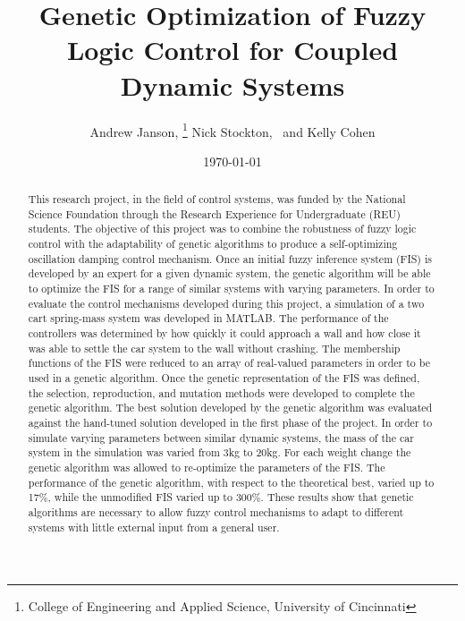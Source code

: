 \documentclass[submit]{aiaa-tc}
\title{Genetic Optimization of Fuzzy Logic Control for Coupled Dynamic Systems}
\author{ %
	Andrew Janson,%
		\thanks{College of Engineering and Applied Science, University of Cincinnati} \space
	 Nick Stockton,%
		\thanksibid{1}
	\ and 
	Kelly Cohen%
		\thanksibid{1}
		}
\date{\today}
\begin{document}
\maketitle
\begin{abstract}
This research project, in the field of control systems, was funded by the National Science Foundation through the Research Experience for Undergraduate (REU) students. The objective of this project was to combine the robustness of fuzzy logic control with the adaptability of genetic algorithms to produce a self-optimizing oscillation damping control mechanism. Once an initial fuzzy inference system (FIS) is developed by an expert for a given dynamic system, the genetic algorithm will be able to optimize the FIS for a range of similar systems with varying parameters. In order to evaluate the control mechanisms developed during this project, a simulation of a two cart spring-mass system was developed in MATLAB. The performance of the controllers was determined by how quickly it could approach a wall and how close it was able to settle the car system to the wall without crashing. The membership functions of the FIS were reduced to an array of real-valued parameters in order to be used in a genetic algorithm. Once the genetic representation of the FIS was defined, the selection, reproduction, and mutation methods were developed to complete the genetic algorithm. The best solution developed by the genetic algorithm was evaluated against the hand-tuned solution developed in the first phase of the project. In order to simulate varying parameters between similar dynamic systems, the mass of the car system in the simulation was varied from 3kg to 20kg. For each weight change the genetic algorithm was allowed to re-optimize the parameters of the FIS. The performance of the genetic algorithm, with respect to the theoretical best, varied up to 17\%, while the unmodified FIS varied up to 300\%. These results show that genetic algorithms are necessary to allow fuzzy control mechanisms to adapt to different systems with little external input from a general user.
\end{abstract}
\end{document}
